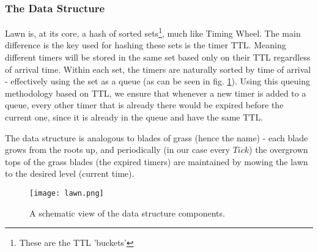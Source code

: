 \documentclass[acmsmall]{acmart} %
\begin{document}
\subsubsection{The Data Structure}
Lawn is, at its core, a hash of sorted sets\footnote{These are the TTL 'buckets'}, much like Timing Wheel. The main difference is the key used for hashing these sets is the timer TTL. Meaning different timers will be stored in the same set based only on their TTL regardless of arrival time. Within each set, the timers are naturally sorted by time of arrival - effectively using the set as a queue  (as can be seen in fig. \ref{fig:Lawn1}). Using this queuing methodology based on TTL, we ensure that whenever a new timer is added to a queue, every other timer that is already there would be expired before the current one, since it is already in the queue and have the same TTL.

The data structure is analogous to blades of grass (hence the name) - each blade grows from the roots up, and periodically (in our case every $Tick$) the overgrown tops of the grass blades (the expired timers) are maintained by mowing the lawn to the desired level (current time).

\begin{figure}
	\centering
	\texttt{[image: lawn.png]}
	\caption[Lawn schematic diagram]{A schematic view of the data structure components.}
	\label{fig:Lawn1}
\end{figure}
\end{document}
